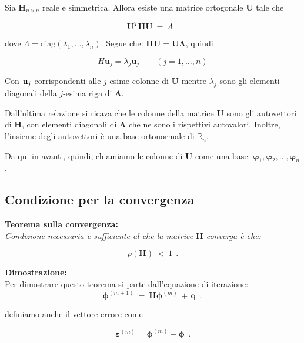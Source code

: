 Sia $\mathbf H_{n\times n}$ reale e simmetrica. Allora esiste una matrice ortogonale $\mathbf U$ tale che

\begin{equation*}
	\mathbf U^T\mathbf H\mathbf U\ =\ \Lambda\ \ .
\end{equation*}

dove $\Lambda = \text{diag}(\lambda_1, \dots, \lambda_n)$. Segue che: $\mathbf H \mathbf U = \mathbf U \mathbf \Lambda$, quindi

\begin{equation*}
	H \boldsymbol{u}_j = \lambda_j \boldsymbol{u}_j
	\qquad (j=1,\dots, n)
\end{equation*}

Con $\textbf u_j$ corrispondenti alle $j$-esime colonne di $\mathbf U$ mentre $\lambda_j$ sono gli elementi diagonali della $j$-esima riga di $\mathbf \Lambda$. 

Dall'ultima relazione si ricava che le colonne della matrice $\mathbf U$ sono gli autovettori di $\mathbf H$, con elementi diagonali di $\mathbf \Lambda$ che ne sono i rispettivi autovalori. Inoltre, l'insieme degli autovettori è una \underline{base ortonormale} di $\mathbb{R}_n$.

Da qui in avanti, quindi, chiamiamo le colonne di $\mathbf U$ come una base: $\boldsymbol{\varphi}_1, \boldsymbol{\varphi}_2,\dots, \boldsymbol{\varphi}_n$.

\subsection{Condizione per la convergenza}

\textbf{Teorema sulla convergenza: }\\
\emph{Condizione necessaria e sufficiente al che la matrice $\mathbf H$ converga è che: }

\[\rho(\mathbf H)\ <\ 1\ \ .\]

\textbf{Dimostrazione:}\\
Per dimostrare questo teorema si parte dall'equazione di iterazione:
\[\mathbf \phi^{(m+1)}\ =\ \mathbf H \mathbf \phi^{(m)}\, +\, \mathbf q\ \ ,\]

definiamo anche il vettore errore come

\begin{equation*}
	\boldsymbol{\varepsilon}^{(m)} = \boldsymbol{\phi}^{(m)} - \boldsymbol{\phi}\ \ .
\end{equation*}

